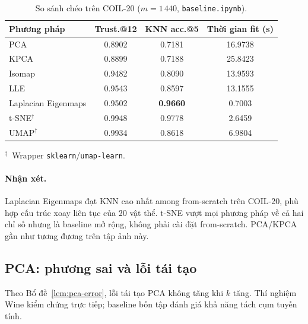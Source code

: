 \begin{table}[H]
  \centering
  \caption{So sánh chéo trên COIL-20 ($m=1\,440$, \texttt{baseline.ipynb}).}
  \label{tab:baseline-coil20-comparison}
  \begin{tabular}{lccc}
    \toprule
    Phương pháp & Trust.@12 & KNN acc.@5 & Thời gian fit (s) \\
    \midrule
    PCA               & 0.8902 & 0.7181          &  16.9738 \\
    KPCA              & 0.8899 & 0.7188          &  25.8423 \\
    Isomap            & 0.9482 & 0.8090          &  13.9593 \\
    LLE               & 0.9543 & 0.8597          &  13.1555 \\
    Laplacian Eigenmaps & 0.9502 & \textbf{0.9660} &   0.7003 \\
    t-SNE$^\dagger$   & 0.9948 & 0.9778          &   2.6459 \\
    UMAP$^\dagger$    & 0.9934 & 0.8618          &   6.9804 \\
    \bottomrule
  \end{tabular}
  \vspace{0.4em}
  {\footnotesize $^\dagger$~Wrapper \texttt{sklearn}/\texttt{umap-learn}.}
\end{table}

\paragraph{Nhận xét.}
Laplacian Eigenmaps đạt KNN cao nhất among from-scratch trên COIL-20, phù hợp
cấu trúc xoay liên tục của 20 vật thể. t-SNE vượt mọi phương pháp về cả hai chỉ
số nhưng là baseline mở rộng, không phải cài đặt from-scratch. PCA/KPCA gần
như tương đương trên tập ảnh này.

\subsection{PCA: phương sai và lỗi tái tạo}

Theo Bổ đề~\ref{lem:pca-error}, lỗi tái tạo PCA không tăng khi $k$ tăng.
Thí nghiệm Wine kiểm chứng trực tiếp; baseline bốn tập đánh giá khả năng tách
cụm tuyến tính.



